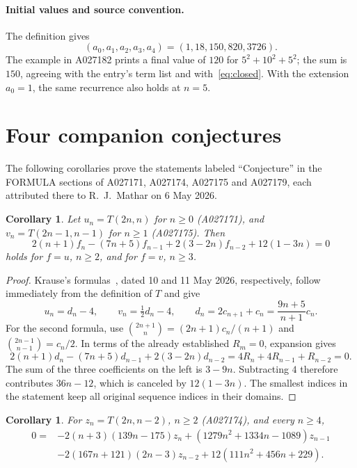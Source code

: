 \documentclass[11pt]{article}
\newtheorem{corollary}[theorem]{Corollary}
\newcommand{\bin}[2]{\binom{#1}{#2}}
\begin{document}
\paragraph{Initial values and source convention.}
The definition gives
\[
(a_0,a_1,a_2,a_3,a_4)=(1,18,150,820,3726).
\]
The example in A027182 prints a final value of $120$ for
$5^2+10^2+5^2$; the sum is $150$, agreeing with the entry's term list
and with~\eqref{eq:closed}. With the extension $a_0=1$, the same
recurrence also holds at $n=5$.

\section*{Four companion conjectures}

The following corollaries prove the statements labeled ``Conjecture'' in
the FORMULA sections of A027171, A027174, A027175 and A027179, each
attributed there to R.\ J.\ Mathar on 6 May 2026.

\begin{corollary}\label{cor:middle}
Let $u_n=T(2n,n)$ for $n\geq0$ (A027171), and
$v_n=T(2n-1,n-1)$ for $n\geq1$ (A027175). Then
\begin{equation}\label{eq:middle}
2(n+1)f_n-(7n+5)f_{n-1}+2(3-2n)f_{n-2}+12(1-3n)=0
\end{equation}
holds for $f=u$, $n\geq2$, and for $f=v$, $n\geq3$.
\end{corollary}

\begin{proof}
Krause's formulas~\cite{A027171,A027175}, dated 10 and 11 May 2026,
respectively, follow immediately from the definition of $T$ and give
\[
u_n=d_n-4,\qquad v_n=\tfrac12d_n-4,\qquad
d_n=2c_{n+1}+c_n=\frac{9n+5}{n+1}c_n.
\]
For the second formula, use
$\bin{2n+1}{n}=(2n+1)c_n/(n+1)$ and
$\bin{2n-1}{n-1}=c_n/2$.
In terms of the already established $R_m=0$, expansion gives
\[
2(n+1)d_n-(7n+5)d_{n-1}+2(3-2n)d_{n-2}
=4R_n+4R_{n-1}+R_{n-2}=0.
\]
The sum of the three coefficients on the left is $3-9n$.
Subtracting $4$ therefore contributes $36n-12$, which is canceled by
$12(1-3n)$. The smallest indices in the statement keep all original
sequence indices in their domains.
\end{proof}

\begin{corollary}\label{cor:near}
For $z_n=T(2n,n-2)$, $n\geq2$ (A027174), and every $n\geq4$,
\begin{equation}\label{eq:near}
\begin{aligned}
0={}&-2(n+3)(139n-175)z_n
 +(1279n^2+1334n-1089)z_{n-1}\\
 &-2(167n+121)(2n-3)z_{n-2}+12(111n^2+456n+229).
\end{aligned}
\end{equation}
\end{corollary}
\end{document}
